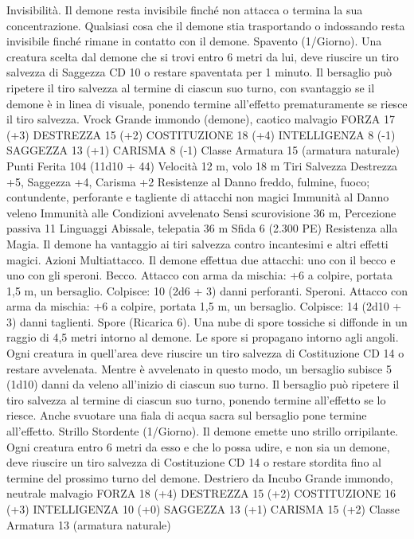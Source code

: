 \begin{multicols}{2}
Invisibilità. Il demone resta invisibile finché non attacca o
termina la sua concentrazione. Qualsiasi cosa che il demone stia
trasportando o indossando resta invisibile finché rimane in
contatto con il demone.
Spavento (1/Giorno). Una creatura scelta dal demone che si trovi
entro 6 metri da lui, deve riuscire un tiro salvezza di Saggezza
CD 10 o restare spaventata per 1 minuto. Il bersaglio può ripetere
il tiro salvezza al termine di ciascun suo turno, con svantaggio se
il demone è in linea di visuale, ponendo termine all’effetto
prematuramente se riesce il tiro salvezza.
Vrock
Grande immondo (demone), caotico malvagio
FORZA 17 (+3)
DESTREZZA 15 (+2)
COSTITUZIONE 18 (+4)
INTELLIGENZA 8 (-1)
SAGGEZZA 13 (+1)
CARISMA 8 (-1)
Classe Armatura 15 (armatura naturale)
Punti Ferita 104 (11d10 + 44)
Velocità 12 m, volo 18 m
Tiri Salvezza Destrezza +5, Saggezza +4, Carisma +2
Resistenze al Danno freddo, fulmine, fuoco; contundente,
perforante e tagliente di attacchi non magici
Immunità al Danno veleno
Immunità alle Condizioni avvelenato
Sensi scurovisione 36 m, Percezione passiva 11
Linguaggi Abissale, telepatia 36 m
Sfida 6 (2.300 PE)
Resistenza alla Magia. Il demone ha vantaggio ai tiri salvezza
contro incantesimi e altri effetti magici.
Azioni
Multiattacco. Il demone effettua due attacchi: uno con il becco e
uno con gli speroni.
Becco. Attacco con arma da mischia: +6 a colpire, portata 1,5 m,
un bersaglio.
Colpisce: 10 (2d6 + 3) danni perforanti.
Speroni. Attacco con arma da mischia: +6 a colpire, portata 1,5
m, un bersaglio.
Colpisce: 14 (2d10 + 3) danni taglienti.
Spore (Ricarica 6). Una nube di spore tossiche si diffonde in un
raggio di 4,5 metri intorno al demone. Le spore si propagano
intorno agli angoli. Ogni creatura in quell’area deve riuscire un
tiro salvezza di Costituzione CD 14 o restare avvelenata. Mentre
è avvelenato in questo modo, un bersaglio subisce 5 (1d10) danni
da veleno all’inizio di ciascun suo turno. Il bersaglio può ripetere
il tiro salvezza al termine di ciascun suo turno, ponendo termine
all’effetto se lo riesce. Anche svuotare una fiala di acqua sacra
sul bersaglio pone termine all’effetto.
Strillo Stordente (1/Giorno). Il demone emette uno strillo
orripilante. Ogni creatura entro 6 metri da esso e che lo possa
udire, e non sia un demone, deve riuscire un tiro salvezza di
Costituzione CD 14 o restare stordita fino al termine del
prossimo turno del demone.
Destriero da Incubo
Grande immondo, neutrale malvagio
FORZA 18 (+4)
DESTREZZA 15 (+2)
COSTITUZIONE 16 (+3)
INTELLIGENZA 10 (+0)
SAGGEZZA 13 (+1)
CARISMA 15 (+2)
Classe Armatura 13 (armatura naturale)

\end{multicols}
